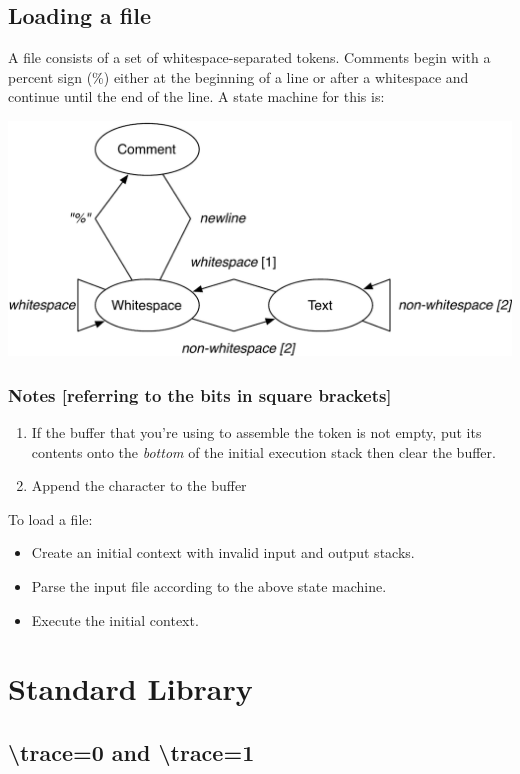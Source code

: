 \documentclass{article}
\let\bs\textbackslash
\begin{document}
{{{{{\subsection{Loading a file}

A file consists of a set of whitespace-separated tokens.  Comments begin with a percent sign (\%) either at the beginning of a line or after a whitespace and continue until the end of the line.  A state machine for this is:

\begin{center}
\includegraphics[width=0.7\columnwidth]{tisbl-sm}
\end{center}

\subsubsection*{Notes [referring to the bits in square brackets]}

\begin{enumerate}
\item If the buffer that you're using to assemble the token is not empty, put its contents onto the \emph{bottom} of the initial execution stack then clear the buffer.
\item Append the character to the buffer
\end{enumerate}

\noindent To load a file:

\begin{itemize}
\item Create an initial context with invalid input and output stacks.
\item Parse the input file according to the above state machine.
\item Execute the initial context.
\end{itemize}

\section{Standard Library}
\subsection{\bs trace=0 and \bs trace=1}

}}}}}
\end{document}
